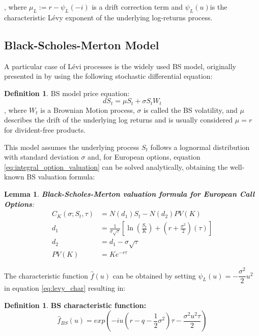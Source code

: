 \documentclass[12,twoside]{mammeTFM}
\newtheorem{lem}[thm]{Lemma}
\theoremstyle{definition}
\newtheorem{definition}[thm]{Definition}
\theoremstyle{remark}
\begin{document}
, where $\mu_L:= r - \psi_L(-i)$ is a drift correction term and $\psi_L(u)$is the characteristic L\'evy exponent of the underlying log-returns process.

\subsection{Black-Scholes-Merton Model} \label{subsec:bs}

A particular case of L\'evi processes is the widely used BS model, originally presented in \cite{bs73} by using the following stochastic differential equation:
\begin{definition} BS model price equation:
\begin{equation}
dS_t = \mu S_t + \sigma S_t W_t
\end{equation}
, where $W_t$ is a Brownian Motion process, $\sigma$ is called the BS volatility, and $\mu$ describes the drift of the underlying log returns and is usually considered $\mu = r$ for divident-free products.
\end{definition}

This model assumes the underlying process $S_t$ follows a lognormal distribution with standard deviation $\sigma$ and, for European options, equation \ref{eq:integral_option_valuation} can be solved analytically, obtaining the well-known BS valuation formula:

\begin{lem} \textbf{Black-Scholes-Merton valuation formula for European Call Options}:
\begin{align}
  C_K(\sigma; S_t, \tau) &= N(d_1)S_t - N(d_2) PV(K) \\
     d_1 &= \frac{1}{\sigma\sqrt{\tau}}\left[\ln\left(\frac{S_t}{K}\right) + \left(r + \frac{\sigma^2}{2}\right)(\tau)\right] \\
     d_2 &= d_1 - \sigma\sqrt{\tau} \\
PV(K) &=Ke^{-r\tau}
\end{align}
\end{lem}

The characteristic function $\hat{f}(u)$ can be obtained by setting $\psi_L (u) = -\dfrac{\sigma^2}{2}u^2$ in equation \ref{eq:levy_char} resulting in:
\begin{definition} \textbf{BS characteristic function:}
\begin{equation}
\hat{f}_{BS}(u) = exp{\left(-iu \left( r-q - \dfrac{1}{2}\sigma^2 \right) \tau - \dfrac{\sigma^2 u^2 \tau}{2} \right)}
\end{equation}
\end{definition}
\end{document}
